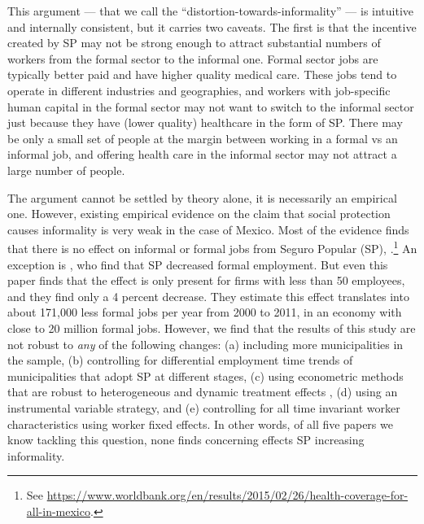 \documentclass[oneside,11pt]{article}
\begin{document}
This argument --- that we call the ``distortion-towards-informality'' --- is intuitive and internally consistent, but it carries two caveats. The first is that the incentive created by SP may not be strong enough to attract substantial numbers of workers from the formal sector to the informal one. Formal sector jobs are typically better paid and have higher quality medical care. These jobs tend to operate in different industries and geographies, and workers with job-specific human capital in the formal sector may not want to switch to the informal sector just because they have (lower quality) healthcare in the form of SP.  There may be only a small set of people at the margin between working in a formal vs an informal job, and offering health care in the informal sector may not attract a large number of people.

The argument cannot be settled by theory alone, it is necessarily an empirical one. However, existing empirical evidence on the claim that social protection causes informality is very weak in the case of Mexico. Most of the evidence finds that there is no effect on informal or formal jobs from Seguro Popular (SP),  \citep{JorgeAlonso, Knox, Azuara, Barros}.\footnote{See \url{https://www.worldbank.org/en/results/2015/02/26/health-coverage-for-all-in-mexico}.} An exception is \cite{Campos}, who find that SP decreased formal employment. But even this paper finds that the effect is only present for firms with less than 50 employees, and they find only a 4 percent decrease. They estimate this effect translates into about 171,000 less formal jobs per year from 2000 to 2011, in an economy with close to 20 million formal jobs. However, we find that the results of this study are not robust to \textit{any} of the following changes: (a) including more municipalities in the sample, (b) controlling for differential employment time trends of municipalities that adopt SP at different stages, (c) using econometric methods that are robust to heterogeneous and dynamic treatment effects \citep{deChaisemartin2020}, (d) using an instrumental variable strategy, and (e) controlling for all time invariant worker characteristics using worker fixed effects. In other words, of all five papers we know tackling this question, none finds concerning effects SP increasing informality.
\end{document}
